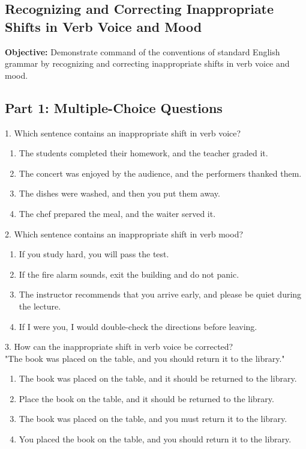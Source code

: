 \documentclass[12pt]{article}
\begin{document}
\subsection*{Recognizing and Correcting Inappropriate Shifts in Verb Voice and Mood}
\onehalfspacing

\begin{tcolorbox}[colframe=black!40, colback=gray!0, title=Learning Objective]
\textbf{Objective:} Demonstrate command of the conventions of standard English grammar by recognizing and correcting inappropriate shifts in verb voice and mood.
\end{tcolorbox}

\subsection*{Part 1: Multiple-Choice Questions}

1. Which sentence contains an inappropriate shift in verb voice?  
\begin{enumerate}[label=\Alph*.]
    \item The students completed their homework, and the teacher graded it.  
    \item The concert was enjoyed by the audience, and the performers thanked them.  
    \item The dishes were washed, and then you put them away.  
    \item The chef prepared the meal, and the waiter served it.  
\end{enumerate}

\vspace{1cm}

2. Which sentence contains an inappropriate shift in verb mood?  
\begin{enumerate}[label=\Alph*.]
    \item If you study hard, you will pass the test.  
    \item If the fire alarm sounds, exit the building and do not panic.  
    \item The instructor recommends that you arrive early, and please be quiet during the lecture.  
    \item If I were you, I would double-check the directions before leaving.  
\end{enumerate}

\vspace{1cm}

3. How can the inappropriate shift in verb voice be corrected? \\  
"The book was placed on the table, and you should return it to the library."  
\begin{enumerate}[label=\Alph*.]
    \item The book was placed on the table, and it should be returned to the library.  
    \item Place the book on the table, and it should be returned to the library.  
    \item The book was placed on the table, and you must return it to the library.  
    \item You placed the book on the table, and you should return it to the library.  
\end{enumerate}
\end{document}
